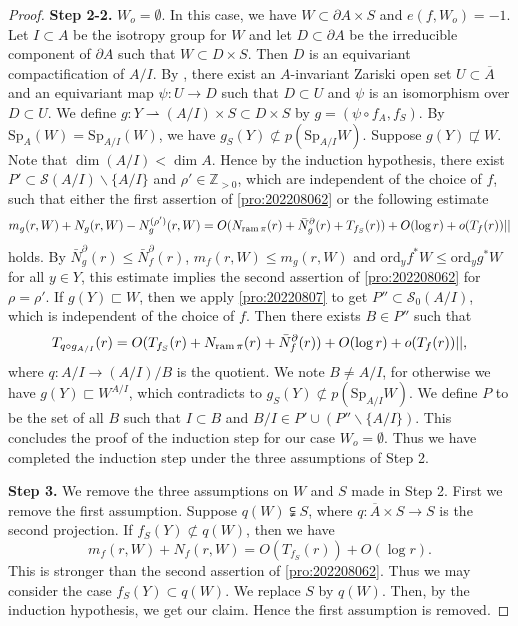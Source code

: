 \documentclass[11pt,english]{smfart}
\theoremstyle{plain}
\theoremstyle{definition}
\theoremstyle{remark}
\numberwithin{equation}{section}
\theoremstyle{plain}
\newcommand{\da}{\rightharpoonup}
\newcommand{\pN}[1]{\bar{N}_{#1}^{\partial}}
\newcommand{\ram}{{\rm ram}\,}
\begin{document}
\begin{proof}
		
\textbf{Step 2-2.}		
		 $W_o=\emptyset$.
		In this case, we have $W\subset \partial A\times S$ and $e(f,W_o)=-1$.
		Let $I\subset A$ be the isotropy group for $W$ and let $D\subset \partial A$ be the irreducible component of $\partial A$ such that $W\subset D\times S$.
		Then $D$ is an equivariant compactification of $A/I$.
		By \cite[Lem A.11]{Y22}, there exist an $A$-invariant Zariski open set $U\subset \overline{A}$ and an equivariant map $\psi:U\to D$ such that $D\subset U$ and $\psi$ is an isomorphism over $D\subset U$.
		We define $g:Y\da (A/I)\times S\subset D\times S$ by $g=(\psi\circ f_A,f_S)$.
		By $\mathrm{Sp}_A(W)=\mathrm{Sp}_{A/I}(W)$, we have $g_S(Y)\not\subset p(\mathrm{Sp}_{A/I}W)$.
		Suppose $g(Y)\not\sqsubset W$.
		Note that $\dim (A/I)<\dim A$.
		Hence by the induction hypothesis, there exist $P'\subset \mathcal{S}(A/I)\backslash \{A/I\}$ and $\rho'\in\mathbb Z_{>0}$, which are independent of the choice of $f$, such that either the first assertion of \cref{pro:202208062} or the following estimate 
		$$m_g(r,W)+N_g(r,W)-N^{(\rho')}_g(r,W)=O(N_{\ram\pi}(r)+\pN{g}(r)
		+T_{f_S}(r))+O(\log r)+o(T_f(r))||
		$$
		holds.
		By $\pN{g}(r)\leq \pN{f}(r)$, $m_f(r,W)\leq m_g(r,W)$ and $\mathrm{ord}_yf^{*}W\leq \mathrm{ord}_yg^{*}W$ for all $y\in Y$, this estimate implies the second assertion of \cref{pro:202208062} for $\rho=\rho'$.
		If $g(Y)\sqsubset W$, then we apply \cref{pro:20220807} to get $P''\subset \mathcal{S}_0(A/I)$, which is independent of the choice of $f$.
		Then there exists $B\in P''$ such that 
		$$T_{q\circ g_{A/I}}(r)=O(T_{f_S}(r)+N_{\ram\pi}(r)+\pN{f}(r))+O(\log r)+o(T_{f}(r))||,
		$$
		where $q:A/I\to (A/I)/B$ is the quotient.
		We note $B\not=A/I$, for otherwise we have $g(Y)\sqsubset W^{A/I}$, which contradicts to $g_S(Y)\not\subset p(\mathrm{Sp}_{A/I}W)$.
		We define $P$ to be the set of all $B$  such that $I\subset B$ and $B/I\in P'\cup (P''\backslash \{A/I\})$.
		This concludes the proof of the induction step for our case $W_o=\emptyset$.
		Thus we have completed the induction step under the three assumptions of Step 2.
		
		\textbf{Step 3.}
		We remove the three assumptions on $W$ and $S$ made in Step 2.
		First we remove the first assumption.
		Suppose $q(W)\subsetneqq S$, where $q:\overline{A}\times S\to S$ is the second projection.
		If $f_{S}(Y)\not\subset q(W)$, then we have 
		$$m_f(r,W)+N_f(r,W)=O(T_{f_S}(r))+O(\log r).$$
		This is stronger than the second assertion of \cref{pro:202208062}.
		Thus we may consider the case $f_{S}(Y)\subset q(W)$.
		We replace $S$ by $q(W)$.
		Then, by the induction hypothesis, we get our claim.	
		Hence the first assumption is removed.	
		

\end{proof}
\end{document}
